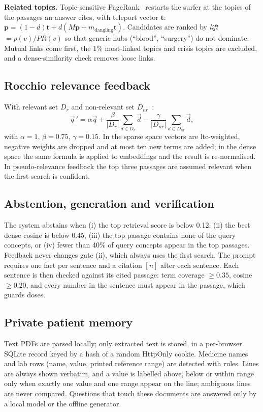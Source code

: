 \documentclass[conference]{IEEEtran}
\begin{document}
\textbf{Related topics.} Topic-sensitive PageRank~\cite{haveliwala2002} restarts the surfer at the topics of the passages an answer cites, with teleport vector $\mathbf{t}$: $\mathbf{p}=(1-d)\mathbf{t}+d(M\mathbf{p}+m_{\text{dangling}}\mathbf{t})$. Candidates are ranked by \emph{lift} $=p(v)/PR(v)$ so that generic hubs (``blood'', ``surgery'') do not dominate. Mutual links come first, the 1\% most-linked topics and crisis topics are excluded, and a dense-similarity check removes loose links.

\subsection{Rocchio relevance feedback}
With relevant set $D_r$ and non-relevant set $D_{nr}$~\cite{rocchio1971}:
\begin{equation}
\vec q\,'=\alpha\vec q+\frac{\beta}{|D_r|}\sum_{d\in D_r}\vec d-\frac{\gamma}{|D_{nr}|}\sum_{d\in D_{nr}}\vec d,
\end{equation}
with $\alpha=1$, $\beta=0.75$, $\gamma=0.15$. In the sparse space vectors are ltc-weighted, negative weights are dropped and at most ten new terms are added; in the dense space the same formula is applied to embeddings and the result is re-normalised. In pseudo-relevance feedback the top three passages are assumed relevant when the first search is confident.

\subsection{Abstention, generation and verification}
The system abstains when (i) the top retrieval score is below 0.12, (ii) the best dense cosine is below 0.45, (iii) the top passage contains none of the query concepts, or (iv) fewer than 40\% of query concepts appear in the top passages. Feedback never changes gate (ii), which always uses the first search. The prompt requires one fact per sentence and a citation $[n]$ after each sentence. Each sentence is then checked against its cited passage: term coverage $\geq0.35$, cosine $\geq0.20$, and every number in the sentence must appear in the passage, which guards doses.

\subsection{Private patient memory}
Text PDFs are parsed locally; only extracted text is stored, in a per-browser SQLite record keyed by a hash of a random HttpOnly cookie. Medicine names and lab rows (name, value, printed reference range) are detected with rules. Lines are always shown verbatim, and a value is labelled above, below or within range only when exactly one value and one range appear on the line; ambiguous lines are never compared. Questions that touch these documents are answered only by a local model or the offline generator.
\end{document}
